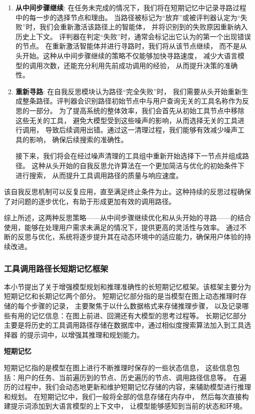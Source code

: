 \begin{enumerate}
  \item \textbf{从中间步骤继续}: 在任务未完成的情况下，我们将在短期记忆中记录寻路过程中的每一步的选择节点和理由。
  当路径被标记为“放弃”或被评判器认定为“失败”时，我们会重新激活该路径上的智能体，
  并将识别到的失败原因重新纳入历史上下文。
  评判器在判定“失败”时，通常会标记出它认为的第一个出现错误的节点。
  在重新激活智能体并进行寻路时，我们将从该节点继续，
  而不是从头开始。这种从中间步骤继续的策略不仅能够加快寻路速度，
  减少大语言模型的调用次数，还能充分利用先前成功调用的经验，
  从而提升决策的准确性。
  \item \textbf{重新寻路}: 在自我反思模块认为路径“完全失败”时，
  我们需要从头开始重新生成整条路径。评判器会识别路径初始节点中与用户查询无关的工具名称作为反思的一部分。
  为了提高系统的整体效率，我们会首先从初始工具节点中移除这些无关的工具，
  避免大模型受到这些噪声的影响，从而选择无关的工具进行调用，
  导致后续调用出错。通过这一清理过程，我们能够有效减少噪声工具的影响，
  确保后续搜索的准确性。\par
  接下来，我们将会在经过噪声清理的工具组中重新开始选择下一节点并组成路径。
  这种从头开始的自我反思允许算法在一个更加简洁与优化的初始条件下进行搜索，
  从而提升工具调用路径的质量与响应速度。
\end{enumerate}
 
该自我反思机制可以反复应用，直至满足终止条件为止。这种持续的反思过程确保了对问题的逐步优化，有助于形成更加有效的调用路径。

综上所述，这两种反思策略——从中间步骤继续优化和从头开始的寻路——的结合使用，能够在处理用户需求未满足的情况下，提供更高的灵活性与效率。
通过不断的反思与优化，系统将逐步提升其在动态环境中的适应能力，确保用户体验的持续改进。

\subsubsection{工具调用路径长短期记忆框架}

本小节提出了关于增强模型规划和推理准确性的长短期记忆框架。该框架主要分为短期记忆和长期记忆两个部分。
短期记忆部分指的是当模型在图上动态推理时存储的每个步骤的记录，
主要聚焦于以什么数据格式来存储推理步骤，
以及记录哪些有用的记忆信息：在图上前进、回溯还有大模型的思考过程等。
长期记忆部分主要是将历史的工具调用路径存储在数据库中，通过相似度搜索算法加入到工具选择器
的提示词中，以增强其推理和规划能力。

\indent \textbf{短期记忆}

短期记忆指的是模型在图上进行不断推理时保存的一些状态信息，
这些信息包括：用户的任务、当前遍历到的节点、历史遍历的节点、调用路径信息等。
在遍历的过程中，我们会动态地更新和维护短期记忆存储的内容，来辅助模型进行推理和规划。
在短期记忆中，我们一般将全部的信息存储在内存中，
然后每次直接构建提示词添加到大语言模型的上下文中，
让模型能够感知到当前的状态和环境。

